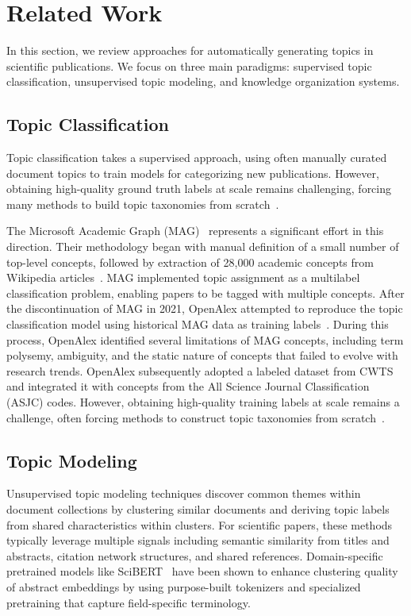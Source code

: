 \section{Related Work}
In this section, we review approaches for automatically generating topics in scientific publications. We focus on three main paradigms: supervised topic classification, unsupervised topic modeling, and knowledge organization systems.

\subsection{Topic Classification} Topic classification takes a supervised approach, using often manually curated document topics to train models for categorizing new publications. However, obtaining high-quality ground truth labels at scale remains challenging, forcing many methods to build topic taxonomies from scratch~\cite{liu2014hierarchical}.

The Microsoft Academic Graph (MAG)~\cite{sinha2015overview} represents a significant effort in this direction. 
Their methodology began with manual definition of a small number of top-level concepts, followed by extraction of 28,000 academic concepts from Wikipedia articles~\cite{shen2018web}. MAG implemented topic assignment as a multilabel classification problem, enabling papers to be tagged with multiple concepts.
After the discontinuation of MAG in 2021, OpenAlex attempted to reproduce the topic classification model using historical MAG data as training labels~\cite{priem2022openalex}. During this process, OpenAlex identified several limitations of MAG concepts, including term polysemy, ambiguity, and the static nature of concepts that failed to evolve with research trends.
OpenAlex subsequently adopted a labeled dataset from CWTS~\cite{van2024open} and integrated it with concepts from the All Science Journal Classification (ASJC) codes. 
However, obtaining high-quality training labels at scale remains a challenge, often forcing methods to construct topic taxonomies from scratch~\cite{liu2014hierarchical}.


\subsection{Topic Modeling} 
Unsupervised topic modeling techniques discover common themes within document collections by clustering similar documents and deriving topic labels from shared characteristics within clusters.
For scientific papers, these methods typically leverage multiple signals including semantic similarity from titles and abstracts, citation network structures, and shared references.
Domain-specific pretrained models like SciBERT~\cite{hosokawa2024} have been shown to enhance clustering quality of abstract embeddings by using purpose-built tokenizers and specialized pretraining that capture field-specific terminology.


